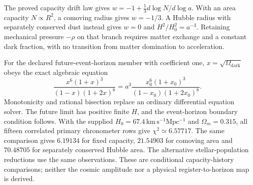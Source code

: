 The proved capacity drift law gives $w=-1+\tfrac13 d\log N/d\log a$.
With an area capacity $N\propto R^2$, a comoving radius gives $w=-1/3$.
A Hubble radius with separately conserved dust instead gives $w=0$ and
$H^2/H_0^2=a^{-3}$. Retaining mechanical pressure $-\rho$ on that branch
requires matter exchange and a constant dark fraction, with no transition
from matter domination to acceleration.

For the declared future-event-horizon member with coefficient one,
$x=\sqrt{\Omega_{\mathrm{dark}}}$ obeys the exact algebraic equation
\[
 \frac{x^6(1+x)^3}{(1-x)(1+2x)^8}
 =a^3\frac{x_0^6(1+x_0)^3}{(1-x_0)(1+2x_0)^8}.
\]
Monotonicity and rational bisection replace an ordinary differential equation
solver. The future limit has positive finite $H$, and the event-horizon
boundary condition follows. With the supplied $H_0=67.4\,\mathrm{km\,s^{-1}
Mpc^{-1}}$ and $\Omega_m=0.315$, all fifteen correlated primary chronometer
rows give $\chi^2\simeq6.57717$. The same comparison gives $6.19134$ for
fixed capacity, $21.54903$ for comoving area and $70.48705$ for separately
conserved Hubble area. The alternative stellar-population reductions use
the same observations. These are conditional capacity-history comparisons;
neither the cosmic amplitude nor a physical register-to-horizon map is derived.
